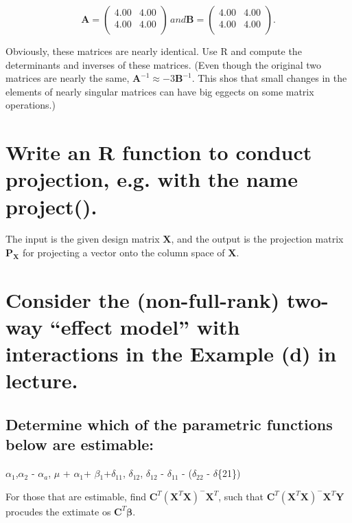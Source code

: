 \documentclass[11pt]{article}
\begin{document}
$$\mathbf{A} = 
\begin{pmatrix}{}
  4.00 & 4.00 \\ 
  4.00 & 4.00 \\ 
  \end{pmatrix}\, and \mathbf{B} =
\begin{pmatrix}{}
  4.00 & 4.00 \\ 
  4.00 & 4.00 \\ 
  \end{pmatrix}.$$

Obviously, these matrices are nearly identical. Use R and compute the
determinants and inverses of these matrices. (Even though the
original two matrices are nearly the same, $\mathbf{A}^{-1} \approx
-3\mathbf{B}^{-1}$. This shos that small changes in the elements of
nearly singular matrices can have big eggects on some matrix
operations.)
\section{Write an R function to conduct projection, e.g. with the name project().}
\label{sec-4}

The input is the given design matrix $\mathbf{X}$, and the output is
the projection matrix $\mathbf{P_X}$ for projecting a vector onto the
column space of $\mathbf{X}$.
\section{Consider the (non-full-rank) two-way ``effect model'' with interactions in the Example (d) in lecture.}
\label{sec-5}
\subsection{Determine which of the parametric functions below are estimable:}
\label{sec-5-1}


$\alpha$$_1$,$\alpha$$_2$ - $\alpha$$_a$, $\mu$ + $\alpha$$_1$+ $\beta$$_1$+$\delta$$_{\mathrm{11}}$,
$\delta$$_{\mathrm{12}}$, $\delta$$_{\mathrm{12}}$ - $\delta$$_{\mathrm{11}}$ - ($\delta$$_{\mathrm{22}}$ - $\delta$\{21\})

For those that are estimable, find $\mathbf{C}^T
(\mathbf{X}^{T}\mathbf{X})^{-}\mathbf{X}^{T}$, such that  $\mathbf{C}^T
(\mathbf{X}^{T}\mathbf{X})^{-}\mathbf{X}^{T}\mathbf{Y}$ procudes the
extimate os $\mathbf{C}^{T}\mathbf{\beta}$.
\end{document}
